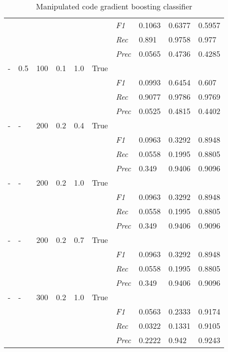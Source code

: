 \begin{table}[]
\begin{tabularx}{\textwidth}{XXXXXX|X|X|X|X}
& & & & & & \textit{F1} & 0.1063 & 0.6377   & 0.5957     \\
& & & & & & \textit{Rec} &  0.891 & 0.9758 & 0.977   \\
& & & & & & \textit{Prec} & 0.0565 & 0.4736 & 0.4285 \\ \midrule
- & 0.5 & 100 & 0.1 & 1.0 &True & & & & \\
& & & & & & \textit{F1} & 0.0993 & 0.6454   & 0.607     \\
& & & & & & \textit{Rec} &  0.9077 & 0.9786 & 0.9769   \\
& & & & & & \textit{Prec} & 0.0525 & 0.4815 & 0.4402 \\ \midrule
- & - & 200 & 0.2 & 0.4 &True & & & & \\
& & & & & & \textit{F1} & 0.0963 & 0.3292   & 0.8948     \\
& & & & & & \textit{Rec} &  0.0558 & 0.1995 & 0.8805   \\
& & & & & & \textit{Prec} & 0.349 & 0.9406 & 0.9096 \\ \midrule
- & - & 200 & 0.2 & 1.0 &True & & & & \\
& & & & & & \textit{F1} & 0.0963 & 0.3292   & 0.8948     \\
& & & & & & \textit{Rec} &  0.0558 & 0.1995 & 0.8805   \\
& & & & & & \textit{Prec} & 0.349 & 0.9406 & 0.9096 \\ \midrule
- & - & 200 & 0.2 & 0.7 &True & & & & \\
& & & & & & \textit{F1} & 0.0963 & 0.3292   & 0.8948     \\
& & & & & & \textit{Rec} &  0.0558 & 0.1995 & 0.8805   \\
& & & & & & \textit{Prec} & 0.349 & 0.9406 & 0.9096 \\ \midrule
- & - & 300 & 0.2 & 1.0 &True & & & & \\
& & & & & & \textit{F1} & 0.0563 & 0.2333   & 0.9174     \\
& & & & & & \textit{Rec} &  0.0322 & 0.1331 & 0.9105   \\
& & & & & & \textit{Prec} & 0.2222 & 0.942 & 0.9243 \\ \midrule
\end{tabularx}
\caption{Manipulated code gradient boosting classifier}
\label{tab:rq3_gradient_boosting_classifier}
\end{table}

